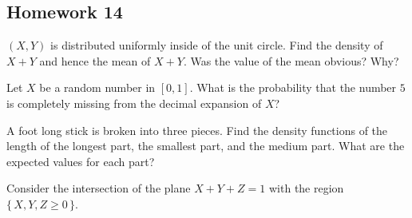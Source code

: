 \subsection{Homework 14}
\begin{problem}[Handout 18, \# 15]
  \((X,Y)\) is distributed uniformly inside of the unit circle. Find the
  density of \(X+Y\) and hence the mean of \(X+Y\). Was the value of the
  mean obvious? Why?
\end{problem}
\begin{solution}
\end{solution}

\begin{problem}[Handout 18, \# 16]
  Let \(X\) be a random number in \([0,1]\). What is the probability that
  the number \(5\) is completely missing from the decimal expansion of
  \(X\)?
\end{problem}
\begin{solution}
\end{solution}

\begin{problem}[Handout 18, \# 17]
  A foot long stick is broken into three pieces. Find the density functions
  of the length of the longest part, the smallest part, and the medium
  part. What are the expected values for each part?
\end{problem}
\begin{solution}
  Consider the intersection of the plane \(X+Y+Z=1\) with the region
  \(\{\,X,Y,Z\geq 0\,\}\).
\end{solution}

